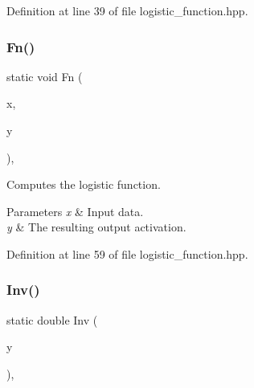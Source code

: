 Definition at line 39 of file logistic\+\_\+function.\+hpp.

\mbox{\label{classmlpack_1_1ann_1_1LogisticFunction_af6cf5da90eb6312e3e25c9b8bd9c3527}} 
\subsubsection{Fn()\hspace{0.1cm}{\footnotesize\ttfamily [2/2]}}
{\footnotesize\ttfamily static void Fn (\begin{DoxyParamCaption}\item[{const Input\+Vec\+Type \&}]{x,  }\item[{Output\+Vec\+Type \&}]{y }\end{DoxyParamCaption})\hspace{0.3cm}{\ttfamily [inline]}, {\ttfamily [static]}}



Computes the logistic function. 


\begin{DoxyParams}{Parameters}
{\em x} & Input data. \\
\hline
{\em y} & The resulting output activation. \\
\hline
\end{DoxyParams}


Definition at line 59 of file logistic\+\_\+function.\+hpp.

\mbox{\label{classmlpack_1_1ann_1_1LogisticFunction_a32d503b167c9646569a202e8c134ef76}} 
\subsubsection{Inv()\hspace{0.1cm}{\footnotesize\ttfamily [1/2]}}
{\footnotesize\ttfamily static double Inv (\begin{DoxyParamCaption}\item[{const double}]{y }\end{DoxyParamCaption})\hspace{0.3cm}{\ttfamily [inline]}, {\ttfamily [static]}}



